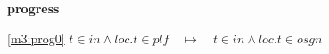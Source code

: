 \textbf{progress}
\begin{block}
\item[ \eqref{m3:prog0} ]{$t \in in \land loc.t \in plf  \quad \mapsto\quad t \in in \land loc.t \in osgn $} %
\end{block}
